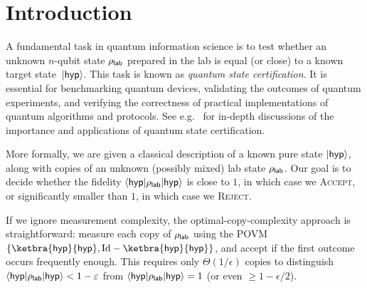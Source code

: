 \DeclarePairedDelimiterX{}
\newcommand{\Del}[3]{\Delta_{#1}\diverg{#2}{#3}}
\newcommand{\EFid}[3]{\mathrm{EFid}_{#1}\diverg{#2}{#3}}

\newcommand{\ketbb}{\ket{\smash{b^\bot}}}
\newcommand{\tpO}{\smash{\widetilde{\smash{\psi}}^0}}
\newcommand{\ktpO}
{\ket{\tpO}}
\newcommand{\tpI}{\smash{\widetilde{\smash{\psi}}^1}}
\newcommand{\ktpI}
{\ket{\tpI}}
\newcommand{\tfO}{\smash{\widetilde{\phi}^0}}
\newcommand{\ktfO}
{\ket{\tfO}}
\newcommand{\tfI}{\smash{\widetilde{\phi}^1}}
\newcommand{\ktfI}
{\ket{\tfI}}
\newcommand{\psip}{\smash{\psi'}}
\newcommand{\phip}{\smash{\phi'}}
\newcommand{\tarp}{\smash{\overline{\tar}}}
\newcommand{\labp}{\smash{\overline{\lab}}}
\newcommand{\tarz}{\smash{\tar^{0}}}
\newcommand{\taro}{\smash{\tar^{1}}}
\newcommand{\labz}{\smash{\lab^{0}}}
\newcommand{\labo}{\smash{\lab^{1}}}

\section{Introduction}
A fundamental task in quantum information science is to test whether an unknown $n$-qubit state $\rho_{\mathsf{lab}}$ prepared in the lab is equal (or close) to a known target state~$\lvert\mathsf{hyp}\rangle$. This task is known as \emph{quantum state certification}. It is essential for benchmarking quantum devices, validating the outcomes of quantum experiments, and verifying the correctness of practical implementations of quantum algorithms and protocols. See e.g.\ \cite{buadescu2019quantum, zhu2019statistical, kliesch2021theory, huang2024certifying} for in-depth discussions of the importance and applications of quantum state certification. 

More formally, we are given a classical description of a known pure state $\lvert\mathsf{hyp}\rangle$, along with copies of an unknown (possibly mixed) lab state $\rho_{\mathsf{lab}}$. Our goal is to decide whether the fidelity $\langle\mathsf{hyp}\rvert\rho_{\mathsf{lab}}\lvert\mathsf{hyp}\rangle$ is close to $1$, in which case we \textsc{Accept}, or significantly smaller than $1$, in which case we \textsc{Reject}.

If we ignore measurement complexity, the optimal-copy-complexity approach is straightforward: measure each copy of $\rho_{\mathsf{lab}}$ using the POVM $\{\ketbra{\tar}{\tar}, \Id - \ketbra{\tar}{\tar}\}$, and accept if the first outcome occurs frequently enough. This requires only $\Theta(1/\epsilon)$ copies to distinguish $\langle\mathsf{hyp}\rvert\rho_{\mathsf{lab}}\lvert\mathsf{hyp}\rangle < 1 - \varepsilon$ from $\langle\mathsf{hyp}\rvert\rho_{\mathsf{lab}}\lvert\mathsf{hyp}\rangle = 1$ (or even $\geq 1 - \epsilon/2$).

